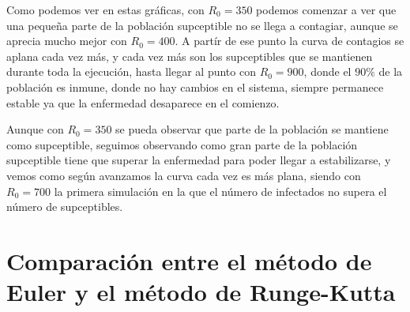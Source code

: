 \documentclass[12pt, spanish]{article}
\begin{document}

Como podemos ver en estas gráficas, con $R_0 = 350$ podemos comenzar a ver que una pequeña parte de la población supceptible no se llega a contagiar, aunque se aprecia mucho mejor con $R_0 = 400$. A partír de ese punto la curva de contagios se aplana cada vez más, y cada vez más son los supceptibles que se mantienen durante toda la ejecución, hasta llegar al punto con $R_0 = 900$, donde el $90\%$ de la población es inmune, donde no hay cambios en el sistema, siempre permanece estable ya que la enfermedad desaparece en el comienzo.

Aunque con $R_0 = 350$ se pueda observar que parte de la población se mantiene como supceptible, seguimos observando como gran parte de la población supceptible tiene que superar la enfermedad para poder llegar a estabilizarse, y vemos como según avanzamos la curva cada vez es más plana, siendo con $R_0 = 700$ la primera simulación en la que el número de infectados no supera el número de supceptibles.


\section{Comparación entre el método de Euler y el método de Runge-Kutta}


%
%
\end{document}
